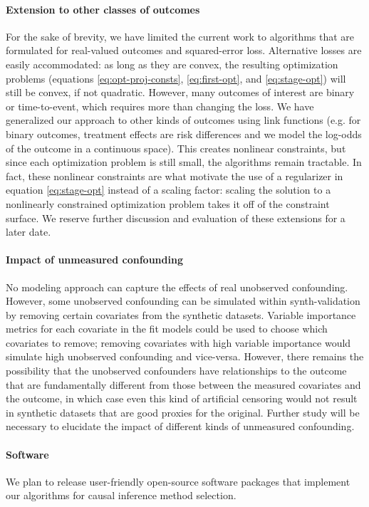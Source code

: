 \paragraph{Extension to other classes of outcomes} For the sake of brevity, we have limited the current work to algorithms that are formulated for real-valued outcomes and squared-error loss. Alternative losses are easily accommodated: as long as they are convex, the resulting optimization problems (equations \ref{eq:opt-proj-consts}, \ref{eq:first-opt}, and \ref{eq:stage-opt}) will still be convex, if not quadratic. However, many outcomes of interest are binary or time-to-event, which requires more than changing the loss. We have generalized our approach to other kinds of outcomes using link functions (e.g. for binary outcomes, treatment effects are risk differences and we model the log-odds of the outcome in a continuous space). This creates nonlinear constraints, but since each optimization problem is still small, the algorithms remain tractable. In fact, these nonlinear constraints are what motivate the use of a regularizer in equation \ref{eq:stage-opt} instead of a scaling factor: scaling the solution to a nonlinearly constrained optimization problem takes it off of the constraint surface. We reserve further discussion and evaluation of these extensions for a later date.

\paragraph{Impact of unmeasured confounding} No modeling approach can capture the effects of real unobserved confounding. However, some unobserved confounding can be simulated within synth-validation by removing certain covariates from the synthetic datasets. Variable importance metrics for each covariate in the fit models could be used to choose which covariates to remove; removing covariates with high variable importance would simulate high unobserved confounding and vice-versa. However, there remains the possibility that the unobserved confounders have relationships to the outcome that are fundamentally different from those between the measured covariates and the outcome, in which case even this kind of artificial censoring would not result in synthetic datasets that are good proxies for the original. Further study will be necessary to elucidate the impact of different kinds of unmeasured confounding.

\paragraph{Software} We plan to release user-friendly open-source software packages that implement our algorithms for causal inference method selection.

